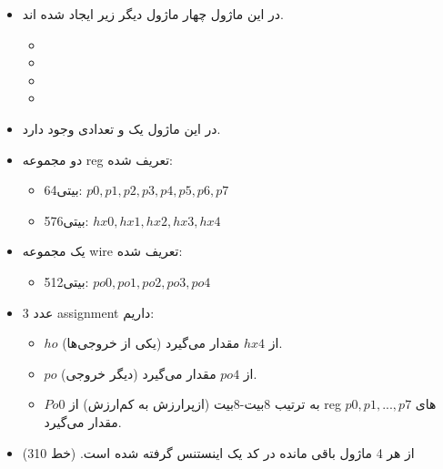 \begin{itemize}
\item
در این ماژول چهار ماژول دیگر زیر ایجاد شده اند. 
\begin{itemize}
\item
{}
\item
{}
\item
{}
\item
{}
\end{itemize}
\item
در این ماژول یک 
و تعدادی 
وجود دارد.
\item
دو مجموعه reg تعریف شده:
\begin{itemize}
\item
64بیتی: $p0, p1, p2, p3, p4, p5, p6, p7$
\item
576بیتی: $hx0, hx1, hx2, hx3, hx4$
\end{itemize}
\item
یک مجموعه wire تعریف شده:
\begin{itemize}
\item
512بیتی: $po0, po1, po2, po3, po4$
\end{itemize}
\item
3 عدد assignment داریم:
\begin{itemize}
\item
 $ho$ (یکی از خروجی‌ها) از $hx4$ مقدار می‌گیرد. 
 \item
$po$ (دیگر خروجی) از $po4$ مقدار می‌گیرد. 
\item
$Po0$ به ترتیب 8بیت-8بیت (ازپرارزش به کم‌ارزش) از reg های $p0, p1, ..., p7$ مقدار می‌گیرد.
\end{itemize}
\item
از هر 4 ماژول باقی مانده
 در کد یک اینستنس گرفته شده است. (خط 310)
 

\end{itemize}
